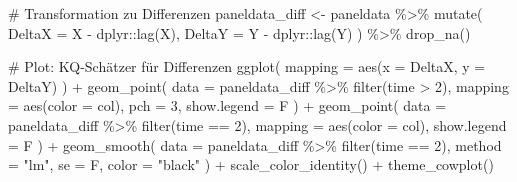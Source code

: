 \documentclass[
  a4paper,
  DIV=11,
  oneside]{scrreprt}
\newenvironment{Shaded}{\begin{snugshade}}{\end{snugshade}}
\newcommand{\AttributeTok}[1]{\textcolor[rgb]{0.40,0.45,0.13}{#1}}
\newcommand{\CommentTok}[1]{\textcolor[rgb]{0.37,0.37,0.37}{#1}}
\newcommand{\DecValTok}[1]{\textcolor[rgb]{0.68,0.00,0.00}{#1}}
\newcommand{\FunctionTok}[1]{\textcolor[rgb]{0.28,0.35,0.67}{#1}}
\newcommand{\NormalTok}[1]{\textcolor[rgb]{0.00,0.23,0.31}{#1}}
\newcommand{\OtherTok}[1]{\textcolor[rgb]{0.00,0.23,0.31}{#1}}
\newcommand{\SpecialCharTok}[1]{\textcolor[rgb]{0.37,0.37,0.37}{#1}}
\newcommand{\StringTok}[1]{\textcolor[rgb]{0.13,0.47,0.30}{#1}}
\begin{document}
\begin{Shaded}
\begin{Highlighting}[]
\CommentTok{\# Transformation zu Differenzen}
\NormalTok{paneldata\_diff }\OtherTok{\textless{}{-}}\NormalTok{ paneldata }\SpecialCharTok{\%\textgreater{}\%} 
  \FunctionTok{mutate}\NormalTok{(}
    \AttributeTok{DeltaX =}\NormalTok{ X }\SpecialCharTok{{-}}\NormalTok{ dplyr}\SpecialCharTok{::}\FunctionTok{lag}\NormalTok{(X),}
    \AttributeTok{DeltaY =}\NormalTok{ Y }\SpecialCharTok{{-}}\NormalTok{ dplyr}\SpecialCharTok{::}\FunctionTok{lag}\NormalTok{(Y)}
\NormalTok{  ) }\SpecialCharTok{\%\textgreater{}\%}
  \FunctionTok{drop\_na}\NormalTok{()}

\CommentTok{\# Plot: KQ{-}Schätzer für Differenzen  }
  \FunctionTok{ggplot}\NormalTok{(}
    \AttributeTok{mapping =} \FunctionTok{aes}\NormalTok{(}\AttributeTok{x =}\NormalTok{ DeltaX, }\AttributeTok{y =}\NormalTok{ DeltaY)}
\NormalTok{  ) }\SpecialCharTok{+} 
    \FunctionTok{geom\_point}\NormalTok{(}
      \AttributeTok{data =}\NormalTok{ paneldata\_diff }\SpecialCharTok{\%\textgreater{}\%} 
        \FunctionTok{filter}\NormalTok{(time }\SpecialCharTok{\textgreater{}} \DecValTok{2}\NormalTok{),}
      \AttributeTok{mapping =} \FunctionTok{aes}\NormalTok{(}\AttributeTok{color =}\NormalTok{ col),}
      \AttributeTok{pch =} \DecValTok{3}\NormalTok{,}
      \AttributeTok{show.legend =}\NormalTok{ F}
\NormalTok{    ) }\SpecialCharTok{+}
    \FunctionTok{geom\_point}\NormalTok{(}
      \AttributeTok{data =}\NormalTok{ paneldata\_diff }\SpecialCharTok{\%\textgreater{}\%} 
        \FunctionTok{filter}\NormalTok{(time }\SpecialCharTok{==} \DecValTok{2}\NormalTok{),}
      \AttributeTok{mapping =} \FunctionTok{aes}\NormalTok{(}\AttributeTok{color =}\NormalTok{ col),}
      \AttributeTok{show.legend =}\NormalTok{ F}
\NormalTok{    ) }\SpecialCharTok{+}
  \FunctionTok{geom\_smooth}\NormalTok{(}
    \AttributeTok{data =}\NormalTok{ paneldata\_diff }\SpecialCharTok{\%\textgreater{}\%} 
      \FunctionTok{filter}\NormalTok{(time }\SpecialCharTok{==} \DecValTok{2}\NormalTok{),}
    \AttributeTok{method =} \StringTok{"lm"}\NormalTok{, }
    \AttributeTok{se =}\NormalTok{ F,}
    \AttributeTok{color =} \StringTok{"black"}
\NormalTok{  ) }\SpecialCharTok{+} 
  \FunctionTok{scale\_color\_identity}\NormalTok{() }\SpecialCharTok{+}
  \FunctionTok{theme\_cowplot}\NormalTok{()}
\end{Highlighting}
\end{Shaded}
\end{document}
